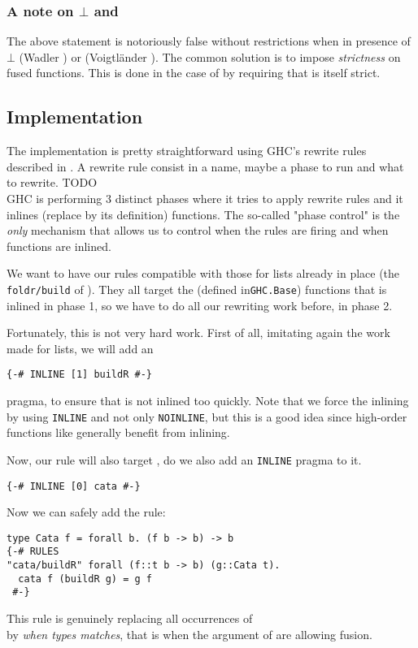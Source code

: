 \subsubsection{A note on $\bot$ and }
The above statement is notoriously false without restrictions when in presence of $\bot$ (Wadler \cite{WADLER1990231}) or  (Voigtländer \cite{JV04}). The common solution is to impose \emph{strictness} on fused functions. This is done in the case of  by requiring that  is itself strict.

\subsection{Implementation}
The implementation is pretty straightforward using GHC's rewrite rules described in \cite{pbr}. A rewrite rule consist in a name, maybe a phase to run and what to rewrite. TODO\\
GHC is performing 3 distinct phases where it tries to apply rewrite rules and it inlines (replace by its definition) functions. The so-called "phase control" is the \emph{only} mechanism that allows us to control when the rules are firing and when functions are inlined.

We want to have our rules compatible with those for lists already in place (the \verb|foldr/build| of \cite{Gill:1993:SCD:165180.165214}). They all target the  (defined in\verb|GHC.Base|) functions that is inlined in phase 1, so we have to do all our rewriting work before, in phase 2.

Fortunately, this is not very hard work. First of all, imitating again the work made for lists, we will add an
\begin{verbatim}
{-# INLINE [1] buildR #-}
\end{verbatim}
pragma, to ensure that  is not inlined too quickly. Note that we force the inlining by using \verb|INLINE| and not only \verb|NOINLINE|, but this is a good idea since high-order functions like  generally benefit from inlining.

Now, our rule will also target , do we also add an \verb|INLINE| pragma to it.
\begin{verbatim}
{-# INLINE [0] cata #-}
\end{verbatim}

Now we can safely add the rule:
\begin{verbatim}
type Cata f = forall b. (f b -> b) -> b
{-# RULES
"cata/buildR" forall (f::t b -> b) (g::Cata t).
  cata f (buildR g) = g f
 #-}
\end{verbatim}
This rule is genuinely replacing all occurrences of\\  by  \emph{when types matches}, that is when the argument of  are allowing fusion.

